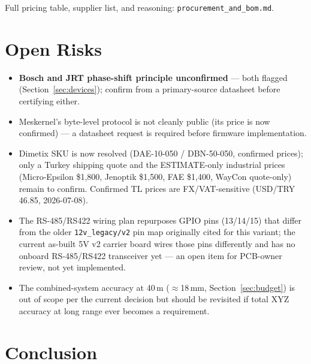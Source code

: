 \documentclass[11pt]{article}
\begin{document}
Full pricing table, supplier list, and reasoning: \texttt{procurement\_and\_bom.md}.

\section{Open Risks}

\begin{itemize}[nosep]
  \item \textbf{Bosch and JRT phase-shift principle unconfirmed} --- both flagged (Section~\ref{sec:devices}); confirm from a primary-source datasheet before certifying either.
  \item Meskernel's byte-level protocol is not cleanly public (its price is now confirmed) --- a datasheet request is required before firmware implementation.
  \item Dimetix SKU is now resolved (DAE-10-050 / DBN-50-050, confirmed prices); only a Turkey shipping quote and the ESTIMATE-only industrial prices (Micro-Epsilon \$1{,}800, Jenoptik \$1{,}500, FAE \$1{,}400, WayCon quote-only) remain to confirm. Confirmed TL prices are FX/VAT-sensitive (USD/TRY 46.85, 2026-07-08).
  \item The RS-485/RS422 wiring plan repurposes GPIO pins (13/14/15) that differ from the older \texttt{12v\_legacy/v2} pin map originally cited for this variant; the current as-built 5V v2 carrier board wires those pins differently and has no onboard RS-485/RS422 transceiver yet --- an open item for PCB-owner review, not yet implemented.
  \item The combined-system accuracy at 40\,m ($\approx$18\,mm, Section~\ref{sec:budget}) is out of scope per the current decision but should be revisited if total XYZ accuracy at long range ever becomes a requirement.
\end{itemize}

\section{Conclusion}
\end{document}
